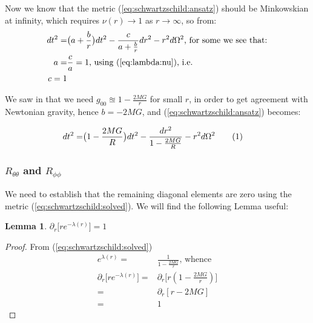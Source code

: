 \documentclass[]{article}
\newcommand\numberthis{\addtocounter{equation}{1}\tag{\theequation}}
\newtheorem{lemma}[thm]{Lemma}
\begin{document}
Now we know that the metric (\ref{eq:schwartzschild:ansatz}) should be Minkowskian at infinity, which requires $\nu(r)\rightarrow 1$ as $r \rightarrow \infty$, so from:
\begin{align*}
	dt^2 =& \big(a + \frac{b}{r}\big) dt^2 - \frac{c}{a + \frac{b}{r}} dr^2 -r^2 d  \Omega^2 \text{, for some we see that:}\\
	a =& \frac{c}{a}=1 \text{, using (\ref{eq:lambda:nu}), i.e.} \\
	c=1
\end{align*}

We saw in \cite[Lecture 5]{susskind2012general} that we need $g_{00}\approxeq1-\frac{2MG}{r}$ for small $r$, in order to get agreement with Newtonian gravity, hence $b=-2MG$, and (\ref{eq:schwartzschild:ansatz}) becomes:

\begin{align*}
	dt^2 =& \big(1-\frac{2MG}{R}\big) dt^2 - \frac{dr^2}{1-\frac{2MG}{R}}  -r^2 d  \Omega^2 \numberthis \label{eq:schwartzschild:solved}
\end{align*}

\subsubsection{$R_{\theta\theta}$ and $R_{\phi\phi}$}
We need to establish that the remaining diagonal elements are zero using the metric (\ref{eq:schwartzschild:solved}). We will find the following Lemma useful:
\begin{lemma}$\partial_r \big[r  e^{-\lambda(r)}\big]=1$ \label{lemma:dL}
\end{lemma}

\begin{proof}
	From (\ref{eq:schwartzschild:solved})
	\begin{align*}
	e^{\lambda(r)} =& \frac{1}{1 - \frac{2MG}{r}} \text{, whence}\\
	\partial_r \big[r  e^{-\lambda(r)}\big] =& \partial_r \big[r(1 - \frac{2MG}{r})\big]\\
	=& \partial_r [r-2MG]\\
	=& 1
	\end{align*}
\end{proof}
\end{document}
